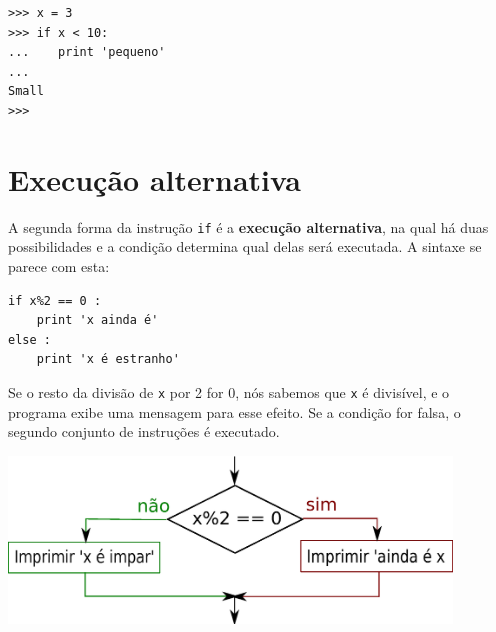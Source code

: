 \beforeverb
\begin{verbatim}
>>> x = 3
>>> if x < 10:
...    print 'pequeno'
... 
Small
>>>
\end{verbatim}
\afterverb
%

\section{Execução alternativa}
\label{execucao alternativa}


A segunda forma da instrução {\tt if} é a {\bf execução alternativa},
na qual há duas possibilidades e a condição determina
qual delas será executada. A sintaxe se parece com esta:


\beforeverb
\begin{verbatim}
if x%2 == 0 :
    print 'x ainda é'
else :
    print 'x é estranho'
\end{verbatim}
\afterverb
%

Se o resto da divisão de {\tt x} por 2 for 0, nós
sabemos que {\tt x} é divisível, e o programa exibe uma mensagem para esse
efeito. Se a condição for falsa, o segundo conjunto de instruções é
executado.


\beforefig
\centerline{\includegraphics[height=1.75in]{figs2/if-else.eps}}
\afterfig

